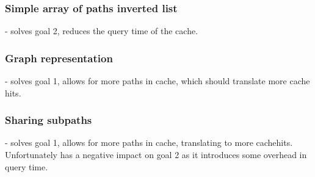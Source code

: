 \subsubsection{Simple array of paths inverted list} - solves goal 2, reduces the query time of the cache.

\subsubsection{Graph representation} - solves goal 1, allows for more paths in cache, which should translate more cache hits.

\subsubsection{Sharing subpaths} - solves goal 1, allows for more paths in cache, translating to more cachehits. Unfortunately has a negative impact on goal 2 as it introduces some overhead in query time.

